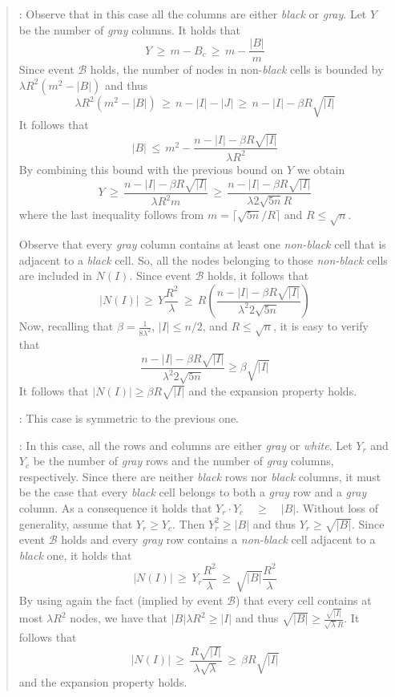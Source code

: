 \documentclass[10pt,a4paper]{article}
\newcommand{\qed}{\hspace{\stretch{1}$\square$}}
\begin{document}
\begin{quote}
\smallskip \noindent
[$B_r \geqslant 1$]: Observe that in this case all the columns are either \emph{black} or \emph{gray}.
Let $Y$ be the number of \emph{gray} columns.  It holds that
$$
Y \, \geqslant \,  m - B_c \, \geqslant \, m - \frac{|B|}{m}
$$
Since event $\mathcal{B}$ holds, the number of nodes in non-\emph{black} cells is bounded by $\lambda
R^2 (m^2 - |B|)$ and thus
$$
\lambda R^2 (m^2 - |B|) \, \geqslant \, n - |I| - |J| \, \geqslant \, n - |I| - \beta R \sqrt{|I|}
$$
It follows that
$$
|B| \, \leqslant \, m^2 - \frac{n - |I| - \beta R \sqrt{|I|}}{\lambda R^2}
$$
By combining this bound with the previous bound on $Y$ we obtain
$$
Y \, \geqslant \, \frac{n - |I| - \beta R \sqrt{|I|}}{\lambda R^2m} \, \geqslant \, \frac{n - |I| - \beta
R \sqrt{|I|}}{\lambda 2\sqrt{5n} R}
$$
where the last inequality follows from $m = \lceil\sqrt{5n}/R\rceil$ and $R \leqslant \sqrt{n}$.

\noindent Observe that every \emph{gray} column contains at least one \emph{non-black} cell that is adjacent
to a \emph{black} cell. So, all the nodes belonging to those \emph{non-black} cells are included in
$N(I)$. Since event $\mathcal{B}$ holds, it follows that
$$
|N(I)| \, \geqslant \, Y \frac{R^2}{\lambda} \, \geqslant \, R\left(\frac{n - |I| - \beta R
\sqrt{|I|}}{\lambda^2 2\sqrt{5n}}\right)
$$
Now, recalling that $\beta = \frac{1}{8\lambda^2}$, $|I| \leqslant n/2$, and $R \leqslant \sqrt{n}$, it is easy to verify that
$$
\frac{n - |I| - \beta R \sqrt{|I|}}{\lambda^2 2\sqrt{5n}} \geqslant \beta\sqrt{|I|}
$$
It follows that $|N(I)| \geqslant \beta R \sqrt{|I|}$ and the expansion property holds.

\smallskip \noindent
[\mbox{\rm $B_c \geqslant 1$ (and $B_r = 0$)}]: This case is symmetric to the previous one.

\smallskip \noindent
[\mbox{\rm $B_r = 0$ and $B_c = 0$}]: In this case, all the rows and columns are either \emph{gray} or
\emph{white}. Let $Y_r$ and $Y_c$ be the number of \emph{gray} rows and the number of \emph{gray}
columns, respectively. Since there are neither \emph{black} rows nor \emph{black} columns, it must be
the case that every \emph{black} cell belongs to both a \emph{gray} row and a \emph{gray} column. As a
consequence it holds that $ Y_r\cdot Y_c \quad \geqslant\quad |B|$. Without loss of generality, assume
that $Y_r \geqslant Y_c$. Then $Y_r^2 \geqslant |B|$ and thus $Y_r \geqslant \sqrt{|B|}$. Since event
$\mathcal{B}$ holds and every \emph{gray} row contains a \emph{non-black} cell adjacent to a \emph{black}
one, it holds that
$$
|N(I)| \, \geqslant \, Y_r \frac{R^2}{\lambda} \, \geqslant \, \sqrt{|B|}\frac{R^2}{\lambda}
$$
By using again the fact (implied by event $\mathcal{B}$) that every cell contains at most $\lambda R^2$ nodes, we have that $|B|\lambda R^2 \geqslant |I|$ and thus $\sqrt{|B|} \geqslant \frac{\sqrt{|I|}}{\sqrt{\lambda}R}$. It follows that
$$
|N(I)| \, \geqslant \, \frac{R\sqrt{|I|}}{\lambda\sqrt{\lambda}} \, \geqslant \, \beta R\sqrt{|I|}
$$
and the expansion property holds.
\qed
\end{quote}
\end{document}
